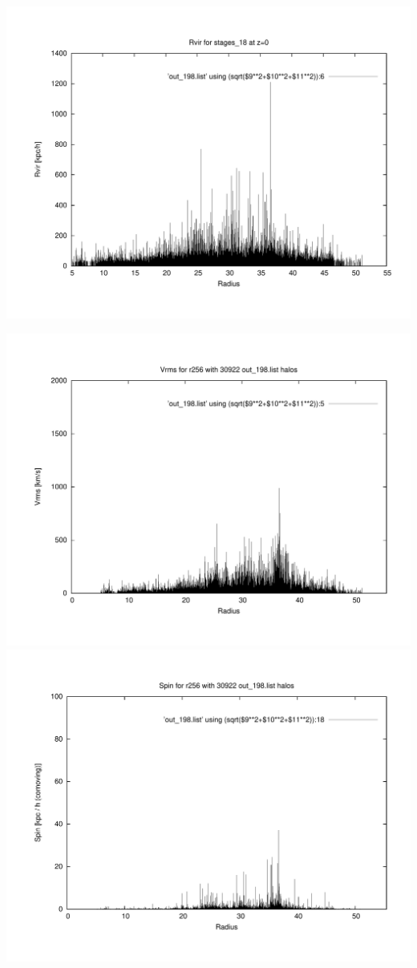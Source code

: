 \includegraphics[scale=0.3]{r256/h100/stages_18/plot_rvir_z0.pdf}

\includegraphics[scale=0.3]{r256/h100/stages_18/plot_Vrms_out_198.pdf}
\includegraphics[scale=0.3]{r256/h100/stages_18/plot_spin_out_198.pdf}





